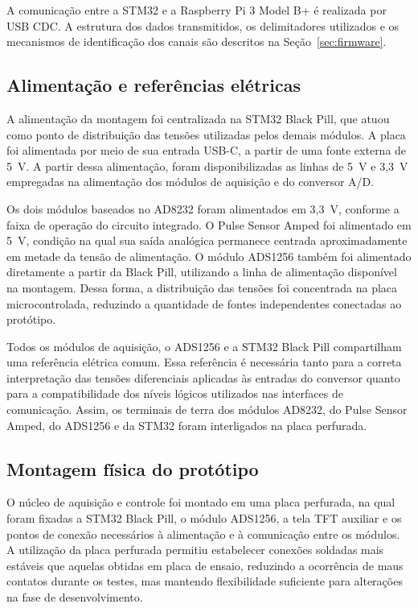\documentclass[a4paper,12pt]{fcte}
\begin{document}
A comunicação entre a STM32 e a Raspberry Pi 3 Model B+ é realizada por USB CDC. A estrutura dos dados transmitidos, os delimitadores utilizados e os mecanismos de identificação dos canais são descritos na Seção~\ref{sec:firmware}.

\subsection{Alimentação e referências elétricas}
\label{subsec:alimentacao_referencias}

A alimentação da montagem foi centralizada na STM32 Black Pill, que atuou como ponto de distribuição das tensões utilizadas pelos demais módulos. A placa foi alimentada por meio de sua entrada USB-C, a partir de uma fonte externa de 5~V. A partir dessa alimentação, foram disponibilizadas as linhas de 5~V e 3,3~V empregadas na alimentação dos módulos de aquisição e do conversor A/D.

Os dois módulos baseados no AD8232 foram alimentados em 3,3~V, conforme a faixa de operação do circuito integrado. O Pulse Sensor Amped foi alimentado em 5~V, condição na qual sua saída analógica permanece centrada aproximadamente em metade da tensão de alimentação. O módulo ADS1256 também foi alimentado diretamente a partir da Black Pill, utilizando a linha de alimentação disponível na montagem. Dessa forma, a distribuição das tensões foi concentrada na placa microcontrolada, reduzindo a quantidade de fontes independentes conectadas ao protótipo.

Todos os módulos de aquisição, o ADS1256 e a STM32 Black Pill compartilham uma referência elétrica comum. Essa referência é necessária tanto para a correta interpretação das tensões diferenciais aplicadas às entradas do conversor quanto para a compatibilidade dos níveis lógicos utilizados nas interfaces de comunicação. Assim, os terminais de terra dos módulos AD8232, do Pulse Sensor Amped, do ADS1256 e da STM32 foram interligados na placa perfurada.


\subsection{Montagem física do protótipo}
\label{subsec:montagem_prototipo}

O núcleo de aquisição e controle foi montado em uma placa perfurada, na qual foram fixadas a STM32 Black Pill, o módulo ADS1256, a tela TFT auxiliar e os pontos de conexão necessários à alimentação e à comunicação entre os módulos. A utilização da placa perfurada permitiu estabelecer conexões soldadas mais estáveis que aquelas obtidas em placa de ensaio, reduzindo a ocorrência de maus contatos durante os testes, mas mantendo flexibilidade suficiente para alterações na fase de desenvolvimento.
\end{document}
